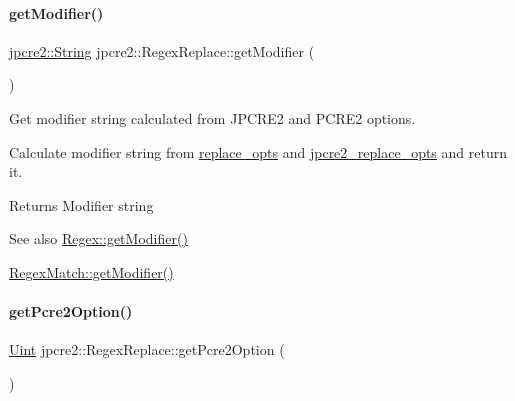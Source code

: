 \paragraph{\texorpdfstring{get\+Modifier()}{getModifier()}}
{\footnotesize\ttfamily \hyperlink{namespacejpcre2_a91f03070152fb228bc116c5a737f1d16}{jpcre2\+::\+String} jpcre2\+::\+Regex\+Replace\+::get\+Modifier (\begin{DoxyParamCaption}{ }\end{DoxyParamCaption})}



Get modifier string calculated from J\+P\+C\+R\+E2 and P\+C\+R\+E2 options. 

Calculate modifier string from \hyperlink{classjpcre2_1_1RegexReplace_afc79699cfcad8b7cbb26864b6b67cdc7}{replace\+\_\+opts} and \hyperlink{classjpcre2_1_1RegexReplace_acf13bcb16918df4b7bcaa7e49a1c7d59}{jpcre2\+\_\+replace\+\_\+opts} and return it.

\begin{DoxyReturn}{Returns}
Modifier string 
\end{DoxyReturn}
\begin{DoxySeeAlso}{See also}
\hyperlink{classjpcre2_1_1Regex_a0ac4e063f00128b96cd94c33609dc559_a0ac4e063f00128b96cd94c33609dc559}{Regex\+::get\+Modifier()} 

\hyperlink{classjpcre2_1_1RegexMatch_a909abcce3c02b07cfcd1173a9d0be9ba_a909abcce3c02b07cfcd1173a9d0be9ba}{Regex\+Match\+::get\+Modifier()} 
\end{DoxySeeAlso}
\hypertarget{classjpcre2_1_1RegexReplace_ac9e158fa5dc0c4d8b27e2dd694e7bc84_ac9e158fa5dc0c4d8b27e2dd694e7bc84}{}\label{classjpcre2_1_1RegexReplace_ac9e158fa5dc0c4d8b27e2dd694e7bc84_ac9e158fa5dc0c4d8b27e2dd694e7bc84} 
\paragraph{\texorpdfstring{get\+Pcre2\+Option()}{getPcre2Option()}}
{\footnotesize\ttfamily \hyperlink{namespacejpcre2_a078242d38221a13fb3543b9edd78c099}{Uint} jpcre2\+::\+Regex\+Replace\+::get\+Pcre2\+Option (\begin{DoxyParamCaption}{ }\end{DoxyParamCaption})\hspace{0.3cm}{\ttfamily [inline]}}



